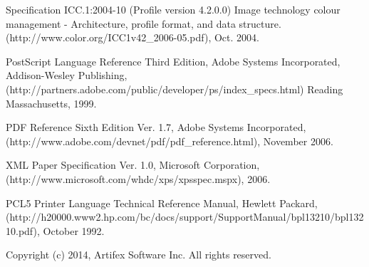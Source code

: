 \documentclass[12pt,notitlepage]{article}
\begin{document}
\begin{thebibliography}{99}

 Specification ICC.1:2004-10 (Profile version 4.2.0.0) Image technology colour management - Architecture, profile format, and data structure.
(http://www.color.org/ICC1v42\_2006-05.pdf), Oct. 2004.

 PostScript Language Reference Third Edition, Adobe Systems Incorporated, Addison-Wesley Publishing, (http://partners.adobe.com/public/developer/ps/index\_specs.html)
Reading Massachusetts, 1999.

 PDF Reference Sixth Edition Ver. 1.7, Adobe Systems Incorporated, (http://www.adobe.com/devnet/pdf/pdf\_reference.html), November 2006.

 XML Paper Specification Ver. 1.0, Microsoft Corporation, (http://www.microsoft.com/whdc/xps/xpsspec.mspx), 2006.

 PCL5 Printer Language Technical Reference Manual, Hewlett Packard, (http://h20000.www2.hp.com/bc/docs/support/SupportManual/bpl13210/bpl13210.pdf), October 1992.

\end{thebibliography}

\vspace*{1.25in}
Copyright (c) 2014, Artifex Software Inc. All rights reserved.
\end{document}
